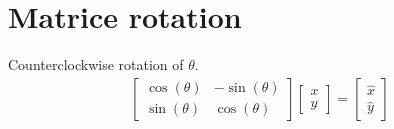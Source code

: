 \section{Matrice rotation}
Counterclockwise rotation of $\theta$.
\begin{eqnarray}
	\begin{bmatrix}	
		\cos{(\theta)} & -\sin{(\theta)}\\
		\sin{(\theta)} & \cos{(\theta)}
	\end{bmatrix}
	\begin{bmatrix}
		x\\
		y
	\end{bmatrix}
	=
	\begin{bmatrix}
		\hat x\\
		\hat y
	\end{bmatrix}
\end{eqnarray}
